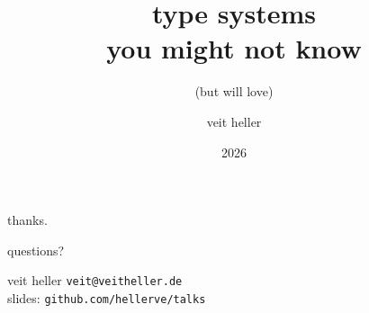 \documentclass[aspectratio=169,14pt]{beamer}
\title{type systems\\ you might not know}
\subtitle{(but will love)}
\author{veit heller}
\institute{cyberwitchery lab}
\date{2026}
\begin{document}
  {
  \begin{frame}[plain]
    \cwlogoright[cwGhost]{0.42\paperheight}%
    \titlepage
  \end{frame}}

  

  {
  \begin{frame}[plain]
    \cwlogoright[cwInk]{0.42\paperheight}%
    \paperheight
    \begin{minipage}{0.62\textwidth}
      {\color{cwInk}thanks.}\par\vskip12pt
      {\cwhanken\large\color{cwTeal}questions?}\par
      \paperheight
      {\cwhanken\color{cwMuted}veit heller \quad \texttt{veit@veitheller.de}}\\[5pt]
      {\cwhanken\color{cwFaint}slides: \texttt{github.com/hellerve/talks}}
    \end{minipage}
  \end{frame}}
\end{document}
